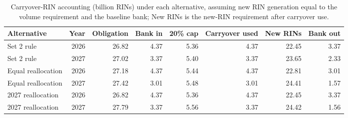 \begin{table}[htbp]
\centering
\caption{Carryover-RIN accounting (billion RINs) under each alternative, assuming new RIN generation equal to the volume requirement and the baseline bank; New RINs is the new-RIN requirement after carryover use.}
\label{tab:accounting}
\footnotesize\setlength{\tabcolsep}{4pt}
\begin{tabular}{lrrrrrrr}
\toprule
Alternative & Year & Obligation & Bank in & 20\% cap & Carryover used & New RINs & Bank out \\
\midrule
Set 2 rule & 2026 & 26.82 & 4.37 & 5.36 & 4.37 & 22.45 & 3.37 \\
Set 2 rule & 2027 & 27.02 & 3.37 & 5.40 & 3.37 & 23.65 & 2.33 \\
Equal reallocation & 2026 & 27.18 & 4.37 & 5.44 & 4.37 & 22.81 & 3.01 \\
Equal reallocation & 2027 & 27.42 & 3.01 & 5.48 & 3.01 & 24.41 & 1.57 \\
2027 reallocation & 2026 & 26.82 & 4.37 & 5.36 & 4.37 & 22.45 & 3.37 \\
2027 reallocation & 2027 & 27.79 & 3.37 & 5.56 & 3.37 & 24.42 & 1.56 \\
\bottomrule
\end{tabular}
\end{table}
